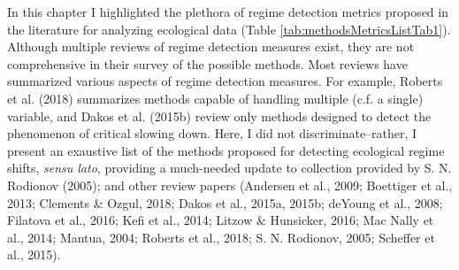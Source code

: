 \documentclass[12pt,twoside,openany]{reedthesis}
\begin{document}
In this chapter I highlighted the plethora of regime detection metrics proposed in the literature for analyzing ecological data (Table \ref{tab:methodsMetricsListTab1}). Although multiple reviews of regime detection measures exist, they are not comprehensive in their survey of the possible methods. Most reviews have summarized various aspects of regime detection measures. For example, Roberts et al. (2018) summarizes methods capable of handling multiple (c.f. a single) variable, and Dakos et al. (2015b) review only methods designed to detect the phenomenon of critical slowing down. Here, I did not discriminate--rather, I present an exaustive list of the methods proposed for detecting ecological regime shifts, \emph{sensu lato}, providing a much-needed update to collection provided by S. N. Rodionov (2005); and other review papers (Andersen et al., 2009; Boettiger et al., 2013; Clements \& Ozgul, 2018; Dakos et al., 2015a, 2015b; deYoung et al., 2008; Filatova et al., 2016; Kefi et al., 2014; Litzow \& Hunsicker, 2016; Mac Nally et al., 2014; Mantua, 2004; Roberts et al., 2018; S. N. Rodionov, 2005; Scheffer et al., 2015).
\end{document}
